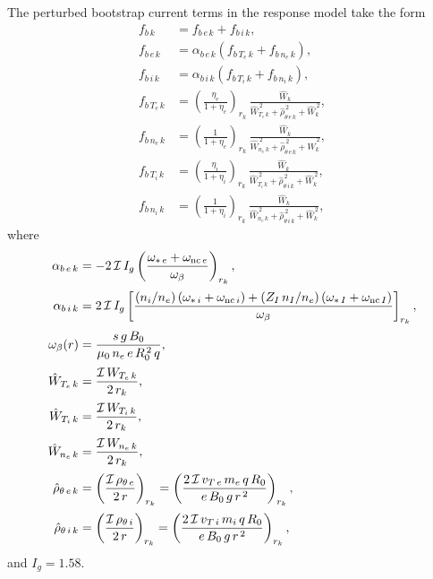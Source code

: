 \documentclass[notitlepage,12pt]{article}
\begin{document}
The perturbed bootstrap current terms in the response model take the form
\begin{align}
f_{b\,k} &= f_{b\,e\,k}+f_{b\,i\,k},\\[0.5ex]
f_{b\,e\,k} &= \alpha_{b\,e\,k}\left(f_{b\,T_e\,k} + f_{b\,n_e\,k}\right),\\[0.5ex]
f_{b\,i\,k} &= \alpha_{b\,i\,k}\left(f_{b\,T_i\,k} + f_{b\,n_i\,k}\right),\\[0.5ex]
f_{b\,T_e\,k}&=\left(\frac{\eta_e}{1+\eta_e}\right)_{r_k}\,\frac{\hat{W}_k}{\hat{W}_{T_e\,k}^{\,2}+\hat{\rho}_{\theta\,e\,k}^{\,2}+\hat{W}_k^{\,2}},\\[0.5ex]
f_{b\,n_e\,k}&=\left(\frac{1}{1+\eta_e}\right)_{r_k}\,\frac{\hat{W}_k}{\hat{W}_{n_e\,k}^{\,2}+\hat{\rho}_{\theta\,e\,k}^{\,2}+\hat{W}_k^{\,2}},\\[0.5ex]
f_{b\,T_i\,k}&=\left(\frac{\eta_i}{1+\eta_i}\right)_{r_k}\,\frac{\hat{W}_k}{\hat{W}_{T_i\,k}^{\,2}+\hat{\rho}_{\theta\,i\,k}^{\,2}+\hat{W}_k^{\,2}},\\[0.5ex]
f_{b\,n_i\,k}&=\left(\frac{1}{1+\eta_i}\right)_{r_k}\,\frac{\hat{W}_k}{\hat{W}_{n_e\,k}^{\,2}+\hat{\rho}_{\theta\,i\,k}^{\,2}+\hat{W}_k^{\,2}},
\end{align}
where
\begin{align}
\alpha_{b\,e\,k} &= -2\,{\cal I}\,I_g\left(\frac{\omega_{\ast\,e}+\omega_{{\rm nc}\,e}}{\omega_\beta}\right)_{r_k},\\[0.5ex]
\alpha_{b\,i\,k} &= 2\,{\cal I}\,I_g\left[\frac{(n_i/n_e)\left(\omega_{\ast\,i}+\omega_{{\rm nc}\,i}\right)+(Z_I\,n_I/n_e)\left(\omega_{\ast\,I}+\omega_{{\rm nc}\,I}\right)}{\omega_\beta}\right]_{r_k},\\[0.5ex]
\omega_{\beta}(r)&= \frac{s\,g\,B_0}{\mu_0\,n_e\,e\,R_0^{\,2}\,q},\\[0.5ex]
\hat{W}_{T_e\,k} &=\frac{{\cal I}\,W_{T_e\,k}}{2\,r_k} ,\\[0.5ex]
\hat{W}_{T_i\,k} &= \frac{{\cal I}\,W_{T_i\,k}}{2\,r_k},\\[0.5ex]
\hat{W}_{n_e\,k} &= \frac{{\cal I}\,W_{n_e\,k}}{2\,r_k},\\[0.5ex]
\hat{\rho}_{\theta\,e\, k} &= \left(\frac{{\cal I}\,\rho_{\theta\,e}}{2\,r}\right)_{r_k}=\left(\frac{2\,{\cal I}\,v_{T\,e}\,m_e\,q\,R_0}{e\,B_0\,g\,r^{\,2}}\right)_{r_k},\\[0.5ex]
\hat{\rho}_{\theta\,i\,k} &= \left(\frac{{\cal I}\,\rho_{\theta\,i}}{2\,r}\right)_{r_k}= \left(\frac{2\,{\cal I}\,v_{T\,i}\,m_i\,q\,R_0}{e\,B_0\,g\,r^{\,2}}\right)_{r_k},
\end{align}
and $I_g = 1.58$.
\end{document}
